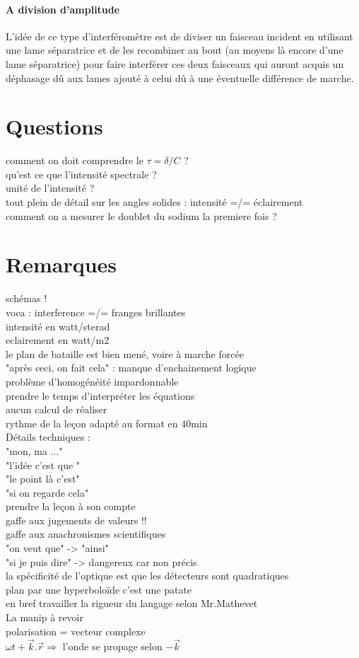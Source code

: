 \documentclass[12pt,prb,aps,epsf]{report}
\begin{document}
\paragraph{A division d'amplitude}L'idée de ce type d'interféromètre est de diviser un faisceau incident en utilisant une lame séparatrice et de les recombiner au bout (au moyens là encore d'une lame séparatrice) pour faire interférer ces deux faisceaux qui auront acquis un déphasage dû aux lames ajouté à celui dû à une éventuelle différence de marche.

\section{Questions}
comment on doit comprendre le $\tau = \delta /C$ ?\\
qu'est ce que l'intensité spectrale ?\\
unité de l'intensité ?\\
tout plein de détail sur les angles solides : intensité =/= éclairement \\
comment on a mesurer le doublet du sodium la premiere fois ? 

\section{Remarques} 
schémas ! \\
voca : interference =/= franges brillantes\\
intensité en watt/sterad\\
eclairement en watt/m2\\
le plan de bataille est bien mené, voire à marche forcée\\
"après ceci, on fait cela" : manque d'enchainement logique\\
problème d'homogénéité impardonnable\\
prendre le temps d'interpréter les équations\\
aucun calcul de réaliser\\
rythme de la leçon adapté au format en 40min\\
Détails techniques : \\
"mon, ma ..."\\
"l'idée c'est que "\\
"le point là c'est"\\
"si on regarde cela"\\
prendre la leçon à son compte\\
gaffe aux jugements de valeurs !!\\
gaffe aux anachronismes scientifiques\\
"on veut que" -> "ainsi"\\
"si je puis dire" -> dangereux car non précis\\
la spécificité de l'optique est que les détecteurs sont quadratiques\\
plan par une hyperboloïde c'est une patate\\
en bref travailler la rigueur du langage selon Mr.Mathevet\\
La manip à revoir\\
polarisation = vecteur complexe\\
$\omega t +\vec{k}.\vec{r} \Rightarrow$ l'onde se propage selon $-\vec{k}$
\end{document}
